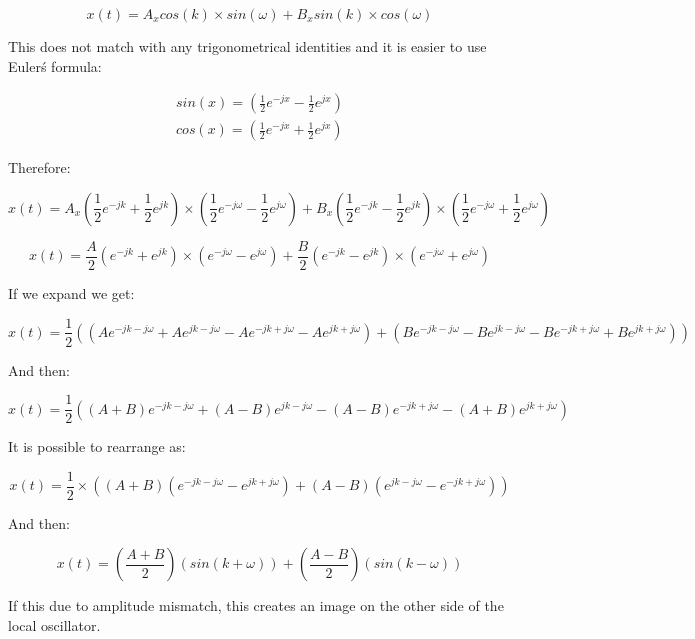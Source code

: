 \begin{equation}
x(t)=A_x cos(k)\times sin(\omega)+ B_x sin(k)\times cos(\omega)
\end{equation}

This does not match with any trigonometrical identities and it is easier to use Euler\'s formula:

\begin{eqnarray}
sin(x)=(\frac{1}{2}e^{-jx} - \frac{1}{2}e^{jx})\\
cos(x)=(\frac{1}{2}e^{-jx} + \frac{1}{2}e^{jx})
\end{eqnarray}

Therefore:

\begin{equation}
x(t)=A_x (\frac{1}{2}e^{-jk} + \frac{1}{2}e^{jk})\times (\frac{1}{2}e^{-j\omega} - \frac{1}{2}e^{j\omega})+ B_x (\frac{1}{2}e^{-jk} - \frac{1}{2}e^{jk})\times (\frac{1}{2}e^{-j\omega} + \frac{1}{2}e^{j\omega})
\end{equation}

\begin{equation}
x(t)=\frac{A}{2} (e^{-jk} + e^{jk})\times (e^{-j\omega} - e^{j\omega})+ \frac{B}{2} (e^{-jk} - e^{jk})\times (e^{-j\omega} + e^{j\omega})
\end{equation}

If we expand we get:

\begin{equation}
x(t)=\frac{1}{2} ((Ae^{-jk-j\omega} + Ae^{jk-j\omega} - Ae^{-jk+j\omega} - Ae^{jk+j\omega}) + (Be^{-jk-j\omega} - Be^{jk-j\omega} - Be^{-jk+j\omega} + Be^{jk+j\omega}))
\end{equation}


And then:

\begin{equation}
x(t)=\frac{1}{2} ((A+B)e^{-jk-j\omega} + (A-B)e^{jk-j\omega} - (A-B)e^{-jk+j\omega} - (A+B)e^{jk+j\omega})
\end{equation}

It is possible to rearrange as:

\begin{equation}
x(t)=\frac{1}{2} \times ((A+B)(e^{-jk-j\omega} - e^{jk+j\omega}) + (A-B)(e^{jk-j\omega} - e^{-jk+j\omega}))
\end{equation}

And then:

\begin{equation}
x(t)=(\frac{A+B}{2} )(sin(k+\omega)) + (\frac{A-B}{2} )(sin(k-\omega))
\end{equation}

If this due to amplitude mismatch, this creates an image on the other side of the local oscillator.
